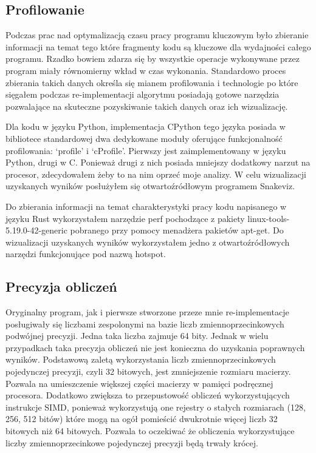 \documentclass[11pt, a4paper]{article}
\begin{document}
\begin{sloppypar}
    \subsection{Profilowanie}
    Podczas prac nad optymalizacją czasu pracy programu kluczowym było zbieranie
    informacji na temat tego które fragmenty kodu są kluczowe dla wydajności całego
    programu. Rzadko bowiem zdarza się by wszystkie operacje wykonywane przez program miały
    równomierny wkład w czas wykonania. Standardowo proces zbierania takich danych
    określa się mianem profilowania i technologie po które sięgałem podczas re-implementacji
    algorytmu posiadają gotowe narzędzia pozwalające na skuteczne pozyskiwanie takich
    danych oraz ich wizualizację.

    Dla kodu w języku Python, implementacja CPython tego języka posiada w bibliotece standardowej
    dwa dedykowane moduły oferujące funkcjonalność profilowania: `profile' i `cProfile'.
    Pierwszy jest zaimplementowany w języku Python, drugi w C. Ponieważ drugi z nich posiada
    mniejszy dodatkowy narzut na procesor, zdecydowałem żeby to na nim oprzeć moje
    analizy. W celu wizualizacji uzyskanych wyników posłużyłem się otwartoźródłowym programem
    Snakeviz\cite{Snakeviz_PyPI}.

    Do zbierania informacji na temat charakterystyki pracy kodu napisanego w języku Rust
    wykorzystałem narzędzie perf pochodzące z pakiety linux-tools-5.19.0-42-generic pobranego
    przy pomocy menadżera pakietów apt-get. Do wizualizacji uzyskanych wyników
    wykorzystałem jedno z otwartoźródłowych narzędzi funkcjonujące pod nazwą hotspot\cite{HOTSPOT}.

    \subsection{Precyzja obliczeń}
    Oryginalny program, jak i pierwsze stworzone przeze mnie re-implementacje
    posługiwały się liczbami zespolonymi na bazie liczb zmiennoprzecinkowych podwójnej
    precyzji. Jedna taka liczba zajmuje 64 bity. Jednak w wielu przypadkach taka
    precyzja obliczeń nie jest konieczna do uzyskania poprawnych wyników. Podstawową zaletą
    wykorzystania liczb zmiennoprzecinkowych pojedynczej precyzji, czyli 32 bitowych, jest
    zmniejszenie rozmiaru macierzy. Pozwala na umieszczenie większej części macierzy w
    pamięci podręcznej procesora. Dodatkowo zwiększa to przepustowość obliczeń wykorzystujących
    instrukcje SIMD, ponieważ wykorzystują one rejestry o stałych rozmiarach (128, 256, 512
    bitów) które mogą na ogół pomieścić dwukrotnie więcej liczb 32 bitowych niż 64
    bitowych. Pozwala to oczekiwać że obliczenia wykorzystujące liczby zmiennoprzecinkowe
    pojedynczej precyzji będą trwały krócej.


\end{sloppypar}
\end{document}
